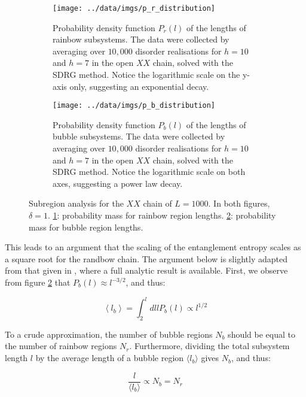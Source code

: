 \begin{figure}[h!]
     \centering
     \begin{subfigure}[b]{0.8\textwidth}
   \texttt{[image: ../data/imgs/p\_r\_distribution]}
    \caption{Probability density function $P_r(l)$ of the lengths of rainbow subsystems. The data were collected by averaging over $10,000$ disorder realisations for $h = 10$ and $h = 7$ in the open $XX$ chain, solved with the SDRG method. Notice the logarithmic scale on the y-axis only, suggesting an exponential decay.}
    \label{fig:p_r_distribution}
    \end{subfigure}%
   \hfill
     \begin{subfigure}[b]{0.8\textwidth}
     \centering
    \texttt{[image: ../data/imgs/p\_b\_distribution]}
    \caption{Probability density function $P_b(l)$ of the lengths of bubble subsystems. The data were collected by averaging over $10,000$ disorder realisations for $h = 10$ and $h = 7$ in the open $XX$ chain, solved with the SDRG method. Notice the logarithmic scale on both axes, suggesting a power law decay.}
    \label{fig:p_b_distribution}
        \end{subfigure}
           \caption{Subregion analysis for the $XX$ chain of $L = 1000$. In both figures, $\delta = 1$. \ref{fig:p_r_distribution}: probability mass for rainbow region lengths. \ref{fig:p_b_distribution}: probability mass for bubble region lengths.}
       \label{fig:subregion_analysis}
\end{figure}

This leads to an argument that the scaling of the entanglement entropy scales as a square root for the randbow chain. The argument below is slightly adapted from that given in \cite{paola2018}, where a full analytic result is available. First, we observe from figure \ref{fig:p_b_distribution} that $P_b(l) \approx l^{-3/2}$, and thus:

\begin{equation}\label{eq:mean_lb}
\left\langle l_{b}\right\rangle=\int_{2}^{l} d l l P_{b}(l) \propto l^{1 / 2}
\end{equation}

To a crude approximation, the number of bubble regions $N_b$ should be equal to the number of rainbow regions $N_r$. Furthermore, dividing the total subsystem length $l$ by the average length of a bubble region $\langle l_b \rangle$  gives $N_b$, and thus: 

\begin{equation}\label{eq:N_regions_identity}
	\frac{l}{\langle l_b \rangle} \propto N_b = N_r
\end{equation}

